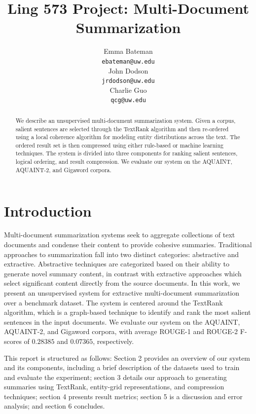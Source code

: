 \documentclass[11pt]{article}
\title{Ling 573 Project: Multi-Document Summarization}
\author{Emma Bateman \\
  {\tt ebateman@uw.edu} \\\And
  John Dodson \\
  {\tt jrdodson@uw.edu} \\\And
  Charlie Guo \\
  {\tt qcg@uw.edu}
  }
\date{}
\begin{document}
\maketitle
\begin{abstract}
We describe an unsupervised multi-document summarization system. Given a corpus, salient sentences are selected through the TextRank algorithm and then re-ordered using a local coherence algorithm for modeling entity distributions across the text. The ordered result set is then compressed using either rule-based or machine learning techniques. The system is divided into three components for ranking salient sentences, logical ordering, and result compression. We evaluate our system on the AQUAINT, AQUAINT-2, and Gigaword corpora.
\end{abstract}

\section{Introduction}

Multi-document summarization systems seek to aggregate collections of text documents and condense their content to provide cohesive summaries. Traditional approaches to summarization fall into two distinct categories: abstractive and extractive. Abstractive techniques are categorized based on their ability to generate novel summary content, in contrast with extractive approaches which select significant content directly from the source documents. In this work, we present an unsupervised system for extractive multi-document summarization over a benchmark dataset. The system is centered around the TextRank algorithm, which is a graph-based technique to identify and rank the most salient sentences in the input documents. We evaluate our system on the AQUAINT, AQUAINT-2, and Gigaword corpora, with average ROUGE-1 and ROUGE-2 F-scores of $0.28385$ and $0.07365$, respectively. 

This report is structured as follows: Section 2 provides an overview of our system and its components, including a brief description of the datasets used to train and evaluate the experiment; section 3 details our approach to generating summaries using TextRank, entity-grid representations, and compression techniques; section 4 presents result metrics; section 5 is a discussion and error analysis; and section 6 concludes.
\end{document}
